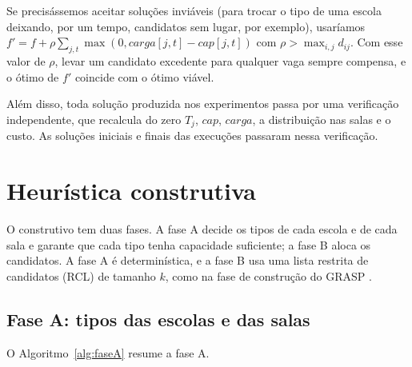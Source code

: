 \documentclass[12pt]{article}
\begin{document}
Se precisássemos aceitar soluções inviáveis (para trocar o tipo de uma escola deixando, por um
tempo, candidatos sem lugar, por exemplo), usaríamos
$f' = f + \rho \sum_{j,t} \max(0, \mathit{carga}[j,t] - \mathit{cap}[j,t])$ com
$\rho > \max_{i,j} d_{ij}$. Com esse valor de $\rho$, levar um candidato excedente para qualquer
vaga sempre compensa, e o ótimo de $f'$ coincide com o ótimo viável.

Além disso, toda solução produzida nos experimentos passa por uma verificação independente, que
recalcula do zero $T_j$, $\mathit{cap}$, $\mathit{carga}$, a distribuição nas salas e o custo. As
soluções iniciais e finais das \nExec{} execuções passaram nessa verificação.

\section{Heurística construtiva}\label{sec:construtivo}

O construtivo tem duas fases. A fase A decide os tipos de cada escola e de cada sala e garante que
cada tipo tenha capacidade suficiente; a fase B aloca os candidatos. A fase A é determinística, e a
fase B usa uma lista restrita de candidatos (RCL) de tamanho $k$, como na fase de construção do
GRASP \cite{feo1995}.

\subsection{Fase A: tipos das escolas e das salas}

O Algoritmo~\ref{alg:faseA} resume a fase A.
\end{document}
